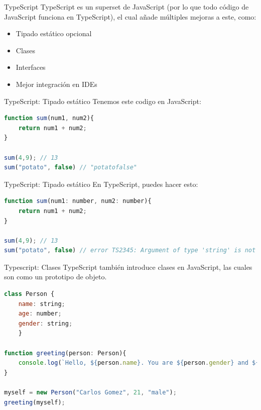 \documentclass{beamer}
\begin{document}
\begin{frame}{TypeScript}
TypeScript es un superset de JavaScript (por lo que todo código de JavaScript funciona en TypeScript), el cual añade múltiples mejoras a este, como:
\begin{itemize}
    \item Tipado estático opcional
    \item Clases
    \item Interfaces
    \item Mejor integración en IDEs
\end{itemize}
\end{frame}

\begin{frame}[fragile]{TypeScript: Tipado estático}
Tenemos este codigo en JavaScript:
\begin{lstlisting}[language=JavaScript]
function sum(num1, num2){
    return num1 + num2;
}

sum(4,9); // 13
sum("potato", false) // "potatofalse"
\end{lstlisting}
\end{frame}

\begin{frame}[fragile]{TypeScript: Tipado estático}
En TypeScript, puedes hacer esto:
\begin{lstlisting}[language=JavaScript]
function sum(num1: number, num2: number){
    return num1 + num2;
}

sum(4,9); // 13
sum("potato", false) // error TS2345: Argument of type 'string' is not assignable to parameter of type 'number'.
\end{lstlisting}
\end{frame}

\begin{frame}[fragile]{Typescript: Clases}
TypeScript también introduce clases en JavaScript, las cuales son como un prototipo de objeto.

\begin{lstlisting}[language=JavaScript]
class Person {
    name: string;
    age: number;
    gender: string;
    }

function greeting(person: Person){
    console.log(`Hello, ${person.name}. You are ${person.gender} and ${person.age} years old.`);
}

myself = new Person("Carlos Gomez", 21, "male");
greeting(myself);
\end{lstlisting}
\end{frame}
\end{document}
